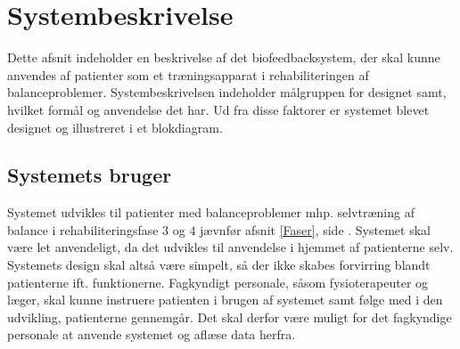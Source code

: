 \section{Systembeskrivelse} 
Dette afsnit indeholder en beskrivelse af det biofeedbacksystem, der skal kunne anvendes af patienter som et træningsapparat i rehabiliteringen af balanceproblemer. Systembeskrivelsen indeholder målgruppen for designet samt, hvilket formål og anvendelse det har. Ud fra disse faktorer er systemet blevet designet og illustreret i et blokdiagram. 

\subsection{Systemets bruger}
Systemet udvikles til patienter med balanceproblemer mhp. selvtræning af balance i rehabiliteringsfase $3$ og $4$ jævnfør afsnit \ref{Faser}, side \pageref{Faser}. Systemet skal være let anvendeligt, da det udvikles til anvendelse i hjemmet af patienterne selv. Systemets design skal altså være simpelt, så der ikke skabes forvirring blandt patienterne ift. funktionerne. Fagkyndigt personale, såsom fysioterapeuter og læger, skal kunne instruere patienten i brugen af systemet samt følge med i den udvikling, patienterne gennemgår. Det skal derfor være muligt for det fagkyndige personale at anvende systemet og aflæse data herfra. 

